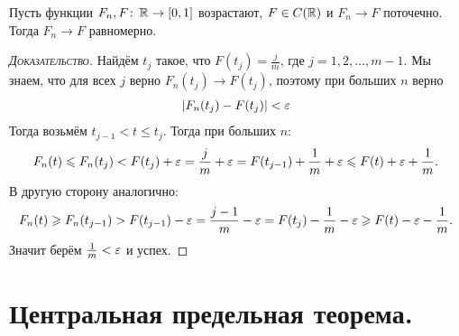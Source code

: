 \documentclass[../main.tex]{subfiles}
\begin{document}
\begin{thm}
 Пусть функции $ F_n, F \colon\, \mathbb{R} \to [0,1] $ возрастают, $ F \in C(\mathbb{R}) $ и $ F_n \to F $ поточечно. Тогда $ F_n \to F $ равномерно.
\end{thm}
\begin{proof}[\normalfont\textsc{Доказательство}]
 Найдём $ t_j $ такое, что $ F(t_j) = \frac{j}{m} $, где $ j = 1, 2, \ldots, m - 1 $. Мы знаем, что для всех $ j $ верно $ F_n(t_j) \to F(t_j) $, поэтому при больших $ n $ верно
 \begin{align*}
  \left| F_n(t_j) - F(t_j) \right| < \varepsilon
 \end{align*} Тогда возьмём $ t_{j-1} < t \leqslant t_j $. Тогда при больших $ n $:
 \begin{align*}
  F_n(t) \leqslant F_n(t_j) < F(t_j) + \varepsilon = \frac{j}{m} + \varepsilon = F(t_{j-1}) + \frac{1}{m} + \varepsilon \leqslant F(t) + \varepsilon + \frac{1}{m}.
 \end{align*} В другую сторону аналогично:
 \begin{align*}
  F_n(t) \geqslant F_n(t_{j-1}) > F(t_{j-1}) - \varepsilon = \frac{j-1}{m} - \varepsilon = F(t_j) - \frac{1}{m} - \varepsilon \geqslant F(t) - \varepsilon - \frac{1}{m}.
 \end{align*} Значит берём $ \frac{1}{m} < \varepsilon $ и успех.
\end{proof}

\section{Центральная предельная теорема.}
\end{document}
